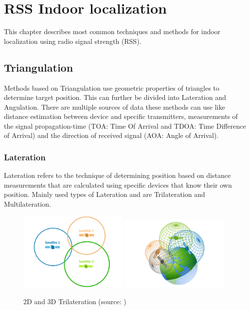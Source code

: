 \chapter{RSS Indoor localization}\label{sec:RSSIndoorLocalization}
This chapter describes most common techniques and methods for indoor localization using radio signal strength (RSS).

\section{Triangulation}\label{sec:Triangulation}
Methods based on Triangulation use geometric properties of triangles to determine target position. This can further be divided into Lateration and Angulation. \cite{RAinWILTaS} There are multiple sources of data these methods can use like distance estimation between device and specific transmitters, measurements of the signal propagation-time (TOA: Time Of Arrival and TDOA: Time Difference of Arrival\cite{LTinWSN}) and the direction of received
signal (AOA: Angle of Arrival\cite{AoALforWSN}).\cite{IILUBLEB}

\subsection{Lateration}\label{sec:Lateration}
Lateration refers to the technique of determining position based on distance measurements that are calculated using specific devices that know their own position.  Mainly used types of Lateration and are Trilateration and Multilateration. 

\begin{figure}[h!]
	\begin{centering}
		\includegraphics[width=0.48\textwidth]{img/trilateration_2d}
		\includegraphics[width=0.48\textwidth]{img/trilateration_3d}
		\par\end{centering}
	\caption{2D and 3D Trilateration (source: \cite{TvTHGPSRW})\label{fig:2d_and_3d_trilateration}}
	\label{fig2}
\end{figure}

